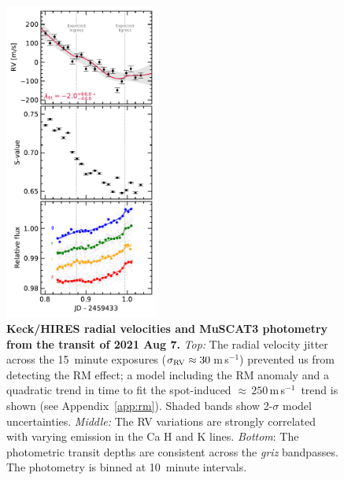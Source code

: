 \documentclass[12pt,modern,twocolumn,tighten,linenumbers,trackchanges]{aastex63}
\newcommand{\ms}{\,m\,s$^{-1}$}
\begin{document}
\begin{figure}[tp]
	\begin{center}
		\leavevmode
		\includegraphics[width=0.45\textwidth]{f7.pdf}
	\end{center}
	\vspace{-0.7cm}
	\caption{
		{\bf Keck/HIRES radial velocities and MuSCAT3 photometry from the transit of 2021 Aug 7.}
		{\it Top:} 
		The radial velocity jitter across the 15~minute exposures
		($\sigma_{\rm RV}\approx30$\ms) prevented us from detecting the RM
		effect;
		a model including the RM anomaly and a quadratic trend in time to
		fit the spot-induced $\approx$\,$250$\ms\ trend is shown (see
		Appendix~\ref{app:rm}).  Shaded bands show 2-$\sigma$ model
		uncertainties.  
		{\it Middle:} The RV variations are strongly correlated with varying
		emission in the Ca H and K lines.
		{\it Bottom}: The photometric transit depths are consistent across
		the {\it griz} bandpasses. The photometry is binned at 10~minute
		intervals.
		\label{fig:ground}
	}
\end{figure}
\end{document}
